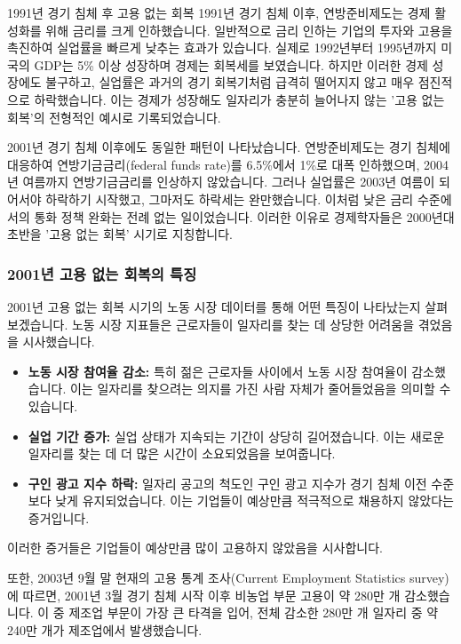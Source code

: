\documentclass[11pt,a4paper]{article}
\begin{document}
\begin{examplebox}{1991년 경기 침체 후 고용 없는 회복}
1991년 경기 침체 이후, 연방준비제도는 경제 활성화를 위해 금리를 크게 인하했습니다. 일반적으로 금리 인하는 기업의 투자와 고용을 촉진하여 실업률을 빠르게 낮추는 효과가 있습니다. 실제로 1992년부터 1995년까지 미국의 GDP는 5\% 이상 성장하며 경제는 회복세를 보였습니다. 하지만 이러한 경제 성장에도 불구하고, 실업률은 과거의 경기 회복기처럼 급격히 떨어지지 않고 매우 점진적으로 하락했습니다. 이는 경제가 성장해도 일자리가 충분히 늘어나지 않는 '고용 없는 회복'의 전형적인 예시로 기록되었습니다.
\end{examplebox}

2001년 경기 침체 이후에도 동일한 패턴이 나타났습니다. 연방준비제도는 경기 침체에 대응하여 연방기금금리(federal funds rate)를 6.5\%에서 1\%로 대폭 인하했으며, 2004년 여름까지 연방기금금리를 인상하지 않았습니다. 그러나 실업률은 2003년 여름이 되어서야 하락하기 시작했고, 그마저도 하락세는 완만했습니다. 이처럼 낮은 금리 수준에서의 통화 정책 완화는 전례 없는 일이었습니다. 이러한 이유로 경제학자들은 2000년대 초반을 '고용 없는 회복' 시기로 지칭합니다.

\subsubsection{2001년 고용 없는 회복의 특징}
2001년 고용 없는 회복 시기의 노동 시장 데이터를 통해 어떤 특징이 나타났는지 살펴보겠습니다. 노동 시장 지표들은 근로자들이 일자리를 찾는 데 상당한 어려움을 겪었음을 시사했습니다.

\begin{itemize}
    \item \textbf{노동 시장 참여율 감소:} 특히 젊은 근로자들 사이에서 노동 시장 참여율이 감소했습니다. 이는 일자리를 찾으려는 의지를 가진 사람 자체가 줄어들었음을 의미할 수 있습니다.
    \item \textbf{실업 기간 증가:} 실업 상태가 지속되는 기간이 상당히 길어졌습니다. 이는 새로운 일자리를 찾는 데 더 많은 시간이 소요되었음을 보여줍니다.
    \item \textbf{구인 광고 지수 하락:} 일자리 공고의 척도인 구인 광고 지수가 경기 침체 이전 수준보다 낮게 유지되었습니다. 이는 기업들이 예상만큼 적극적으로 채용하지 않았다는 증거입니다.
\end{itemize}
이러한 증거들은 기업들이 예상만큼 많이 고용하지 않았음을 시사합니다.

또한, 2003년 9월 말 현재의 고용 통계 조사(Current Employment Statistics survey)에 따르면, 2001년 3월 경기 침체 시작 이후 비농업 부문 고용이 약 280만 개 감소했습니다. 이 중 제조업 부문이 가장 큰 타격을 입어, 전체 감소한 280만 개 일자리 중 약 240만 개가 제조업에서 발생했습니다.
\end{document}

